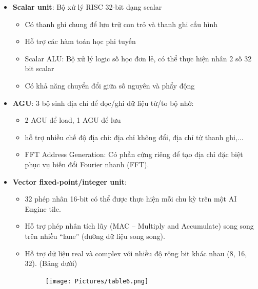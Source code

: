 \begin{itemize}
    \item \textbf{Scalar unit}: Bộ xử lý RISC 32-bit dạng scalar
    \begin{itemize}
        \item Có thanh ghi chung để lưu trữ con trỏ và thanh ghi cấu hình
        \item Hỗ trợ các hàm toán học phi tuyến
        \item Scalar ALU: Bộ xử lý logic số học đơn lẻ, có thể thực hiện nhân 2 số 32 bit scalar
        \item Có khả năng chuyển đổi giữa số nguyên và phẩy động
    \end{itemize}
    \item \textbf{AGU}: 3 bộ sinh địa chỉ  để đọc/ghi dữ liệu từ/to bộ nhớ:
    \begin{itemize}
        \item 2 AGU để load, 1 AGU để lưu
    \end{itemize}
    \begin{itemize}
        \item hỗ trợ nhiều chế độ địa chỉ: địa chỉ không đổi, địa chỉ từ thanh ghi,...
        \item FFT Address Generation: Có phần cứng riêng để tạo địa chỉ đặc biệt phục vụ biến đổi Fourier nhanh (FFT).
    \end{itemize}
    \item  \textbf{Vector fixed-point/integer unit}:
    \begin{itemize}
        \item 32 phép nhân 16-bit có thể được thực hiện mỗi chu kỳ trên một AI Engine tile.
        \item Hỗ trợ phép nhân tích lũy (MAC – Multiply and Accumulate) song song trên nhiều “lane” (đường dữ liệu song song). 
        \item Hỗ trợ dữ liệu real và complex với nhiều độ rộng bit khác nhau (8, 16, 32). (Bảng dưới)
        
        \begin{figure}[H]
        \centering
        \texttt{[image: Pictures/table6.png]}
        

\end{figure}
\end{itemize}
\end{itemize}
